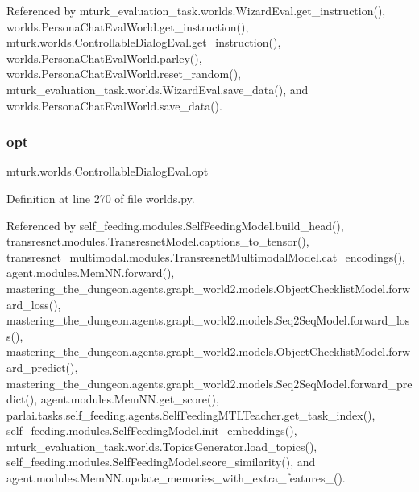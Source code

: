 Referenced by mturk\+\_\+evaluation\+\_\+task.\+worlds.\+Wizard\+Eval.\+get\+\_\+instruction(), worlds.\+Persona\+Chat\+Eval\+World.\+get\+\_\+instruction(), mturk.\+worlds.\+Controllable\+Dialog\+Eval.\+get\+\_\+instruction(), worlds.\+Persona\+Chat\+Eval\+World.\+parley(), worlds.\+Persona\+Chat\+Eval\+World.\+reset\+\_\+random(), mturk\+\_\+evaluation\+\_\+task.\+worlds.\+Wizard\+Eval.\+save\+\_\+data(), and worlds.\+Persona\+Chat\+Eval\+World.\+save\+\_\+data().

\mbox{\label{classmturk_1_1worlds_1_1ControllableDialogEval_acdc5ce48bdc92b72461ea2e9bfa613f8}} 
\subsubsection{\texorpdfstring{opt}{opt}}
{\footnotesize\ttfamily mturk.\+worlds.\+Controllable\+Dialog\+Eval.\+opt}



Definition at line 270 of file worlds.\+py.



Referenced by self\+\_\+feeding.\+modules.\+Self\+Feeding\+Model.\+build\+\_\+head(), transresnet.\+modules.\+Transresnet\+Model.\+captions\+\_\+to\+\_\+tensor(), transresnet\+\_\+multimodal.\+modules.\+Transresnet\+Multimodal\+Model.\+cat\+\_\+encodings(), agent.\+modules.\+Mem\+N\+N.\+forward(), mastering\+\_\+the\+\_\+dungeon.\+agents.\+graph\+\_\+world2.\+models.\+Object\+Checklist\+Model.\+forward\+\_\+loss(), mastering\+\_\+the\+\_\+dungeon.\+agents.\+graph\+\_\+world2.\+models.\+Seq2\+Seq\+Model.\+forward\+\_\+loss(), mastering\+\_\+the\+\_\+dungeon.\+agents.\+graph\+\_\+world2.\+models.\+Object\+Checklist\+Model.\+forward\+\_\+predict(), mastering\+\_\+the\+\_\+dungeon.\+agents.\+graph\+\_\+world2.\+models.\+Seq2\+Seq\+Model.\+forward\+\_\+predict(), agent.\+modules.\+Mem\+N\+N.\+get\+\_\+score(), parlai.\+tasks.\+self\+\_\+feeding.\+agents.\+Self\+Feeding\+M\+T\+L\+Teacher.\+get\+\_\+task\+\_\+index(), self\+\_\+feeding.\+modules.\+Self\+Feeding\+Model.\+init\+\_\+embeddings(), mturk\+\_\+evaluation\+\_\+task.\+worlds.\+Topics\+Generator.\+load\+\_\+topics(), self\+\_\+feeding.\+modules.\+Self\+Feeding\+Model.\+score\+\_\+similarity(), and agent.\+modules.\+Mem\+N\+N.\+update\+\_\+memories\+\_\+with\+\_\+extra\+\_\+features\+\_\+().

